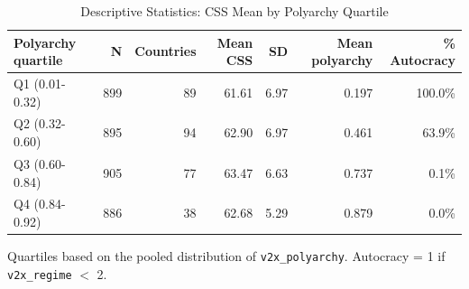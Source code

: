 \begin{table}[htbp]
\caption{\label{tab:desc_polyarchy} Descriptive Statistics: CSS Mean by Polyarchy Quartile}
\bigskip
\centering
\begin{tabular}{lrrrrrr}
\toprule
Polyarchy quartile & N & Countries & Mean CSS & SD & Mean polyarchy & \% Autocracy \\
\midrule
Q1 (0.01-0.32) & 899 & 89 & 61.61 & 6.97 & 0.197 & 100.0\% \\
Q2 (0.32-0.60) & 895 & 94 & 62.90 & 6.97 & 0.461 & 63.9\% \\
Q3 (0.60-0.84) & 905 & 77 & 63.47 & 6.63 & 0.737 & 0.1\% \\
Q4 (0.84-0.92) & 886 & 38 & 62.68 & 5.29 & 0.879 & 0.0\% \\
\bottomrule
\end{tabular}
\par \raggedright
Quartiles based on the pooled distribution of \texttt{v2x\_polyarchy}. Autocracy = 1 if \texttt{v2x\_regime} $<$ 2.
\end{table}
